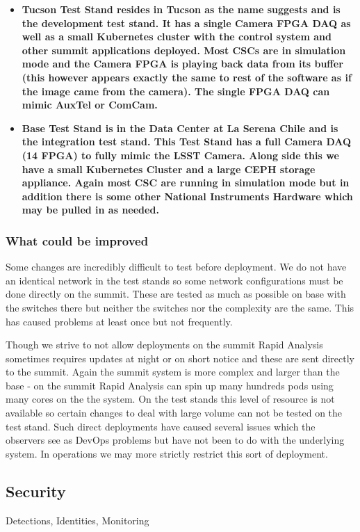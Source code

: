 \begin{itemize}
\item \bf{Tucson Test Stand} resides in Tucson as the name suggests and is the development test stand. It has a single Camera FPGA DAQ as well as a small Kubernetes cluster with the control system and other summit  applications deployed.
Most CSCs are in simulation mode and the Camera FPGA is playing back data from its buffer (this however appears exactly the same to rest of the software as if the image came from the camera).
The single FPGA DAQ can mimic AuxTel or ComCam.
\item \bf{Base Test Stand} is in the Data Center at La Serena Chile and is the integration test stand.
This Test Stand has a full Camera DAQ (14 FPGA) to fully mimic the LSST Camera.
Along side this we have a small Kubernetes Cluster and a large CEPH storage appliance.
Again most CSC are running in simulation mode but in addition there is some other National Instruments Hardware which may be pulled in as needed.
\end{itemize}


\subsubsection{What could be improved}
Some changes are incredibly difficult to test before deployment.
We do not have an identical network in the test stands so some network configurations must be done directly on the summit.
These are tested as much as possible on base with the switches there but neither the switches nor the complexity are the same.
This has caused problems at least once but not frequently.

Though we strive to not allow deployments on the summit Rapid Analysis sometimes requires updates at night or on short notice and these are sent directly to the summit.
Again the summit system is more complex and larger than the base - on the summit Rapid Analysis can spin up many hundreds pods using many cores on the the system.
On the test stands this level of resource is not available so certain changes to deal with large volume can not be tested on the test stand.
Such direct deployments have caused several issues which the observers see as DevOps problems but have not been to do with the underlying system.
In operations we may more strictly restrict this sort of deployment.

\subsection{Security}
Detections, Identities, Monitoring

